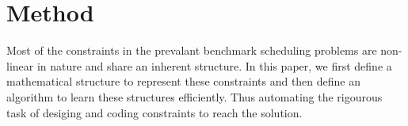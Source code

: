 \documentclass{article}
\newcommand{\TY}{\textbf{Y}\xspace}
\newcommand{\TZ}{\textbf{Z}\xspace}
\newcommand{\TE}{\textbf{E}\xspace}
\begin{document}


\section{Method}
\label{sec:method}

Most of the constraints in the prevalant benchmark scheduling problems are non-linear in nature and share an inherent structure. In this paper, we first define a mathematical structure to represent these constraints and then define an algorithm to learn these structures efficiently. Thus automating the rigourous task of desiging and coding constraints to reach the solution.
\end{document}
